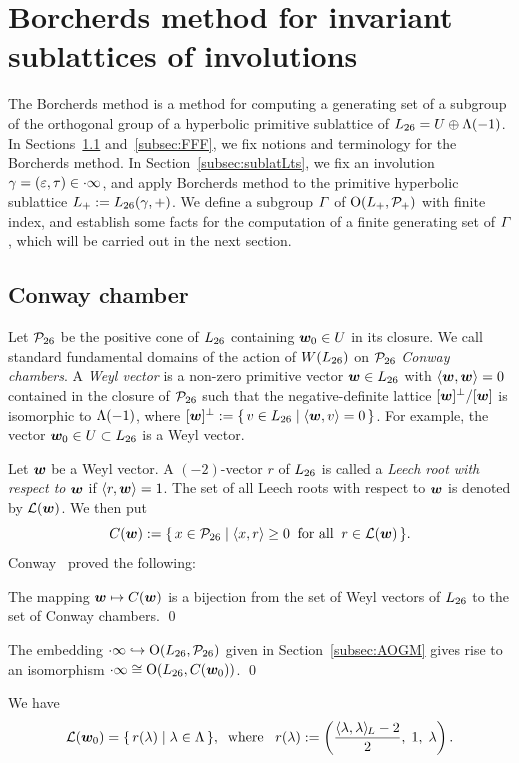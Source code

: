 \documentclass{amsart} %
\begin{document}
\section{Borcherds method for invariant sublattices of involutions}\label{sec:Borcherds}
%
The Borcherds method is a method for computing a generating set of 
a subgroup of the orthogonal group
of a hyperbolic primitive sublattice of $L_{26}=U\oplus \Lambda(-1)$.
In Sections~\ref{subsec:ConwayChamber} and~\ref{subsec:FFF},
we fix notions and terminology for the Borcherds method.
In Section~\ref{subsec:sublatLts}, 
we fix an involution
$\gamma=(\varepsilon, \tau)\in \cdot \infty$, and 
apply Borcherds method to the primitive hyperbolic sublattice
$L_{+}:=L_{26}(\gamma, +)$.
We define a subgroup $\varGamma$ of $ \mathord{\mathrm{O}}(L_{+}, \mathord{\mathcal{P}}_{+})$
with finite index, and establish some facts
for the computation of a finite generating set of
 $\varGamma$, which will be carried out in the next section.
%
%
\subsection{Conway chamber}\label{subsec:ConwayChamber}
%
Let $\mathord{\mathcal{P}}_{26}$ be the 
positive cone of $L_{26}$ 
containing $\boldsymbol{w}_0\in U$ in its closure.
We call standard fundamental domains of the action of $W(L_{26})$ on $\mathord{\mathcal{P}}_{26}$ 
\emph{Conway chambers}.
A \emph{Weyl vector} is a non-zero primitive vector $\boldsymbol{w} \in L_{26}$
with $\langle \boldsymbol{w} , \boldsymbol{w}  \rangle=0$ contained in 
the closure of $\mathord{\mathcal{P}}_{26}$ such that
the negative-definite lattice $[\boldsymbol{w} ]^{\perp}/[\boldsymbol{w} ]$ is isomorphic to $\Lambda(-1)$,
where $[\boldsymbol{w} ]^{\perp}:=\{\,{v\in L_{26}}\mid {\langle \boldsymbol{w}, v \rangle=0} \,\}$.
For example, 
the vector $\boldsymbol{w}_0\in U\subset L_{26}$ is a Weyl vector.
\par
Let $\boldsymbol{w} $ be a Weyl vector.
A $(-2)$-vector $r$ of $L_{26}$ is called a \emph{Leech root with respect to $\boldsymbol{w} $} if $\langle r, \boldsymbol{w}  \rangle=1$.
The set of all Leech roots with respect to $\boldsymbol{w} $ is denoted by $\mathord{\mathcal{L}}(\boldsymbol{w} )$.
We then put
\[
\mathord{C}(\boldsymbol{w} ):=\{\,{x\in\mathord{\mathcal{P}}_{26}}\mid {\langle x, r \rangle\ge 0\;\;\textrm{for all}\;\; r\in \mathord{\mathcal{L}}(\boldsymbol{w})} \,\}.
\]
%
Conway~\cite{MR690711} proved the following:
%
\begin{theorem}
The mapping $\boldsymbol{w} \mapsto \mathord{C}(\boldsymbol{w})$ is a bijection from the set of Weyl vectors of $L_{26}$ to
the set of Conway chambers.
\qed
\end{theorem}
%
\begin{corollary}
The embedding $\cdot \infty\hookrightarrow \mathord{\mathrm{O}}(L_{26}, \mathord{\mathcal{P}}_{26})$ given in Section~\ref{subsec:AOGM} 
gives rise to an isomorphism 
$\cdot \infty\cong \mathord{\mathrm{O}}(L_{26}, \mathord{C}(\boldsymbol{w}_0))$.
\qed
\end{corollary}
%
%
We have 
\begin{equation}\label{eq:Leechrootlambda}
\mathord{\mathcal{L}}(\boldsymbol{w}_0)=\{\,{r(\lambda)}\mid {\lambda\in \Lambda} \,\},
\;\;\textrm{where}\;\;\; r(\lambda):=\left(\frac{\langle \lambda, \lambda \rangle_{\hskip -1pt L}-2}{2}, \; 1,\; \lambda\right).
\end{equation}
%
%
\end{document}
